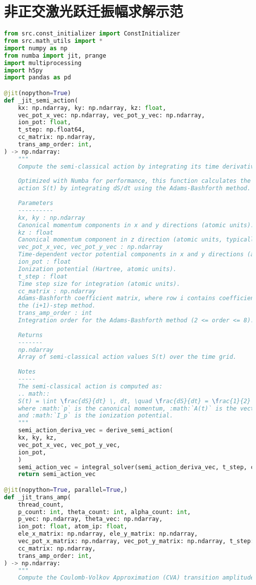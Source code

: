 \section{非正交激光跃迁振幅求解示范}\label{app:notc_cva_trans_amp}
\begin{lstlisting}[language=Python, caption={非正交激光跃迁振幅求解示范}, label={code:notc cva trans amp}]
from src.const_initializer import ConstInitializer
from src.math_utils import *
import numpy as np
from numba import jit, prange
import multiprocessing
import h5py
import pandas as pd

@jit(nopython=True)
def _jit_semi_action(
	kx: np.ndarray, ky: np.ndarray, kz: float,
	vec_pot_x_vec: np.ndarray, vec_pot_y_vec: np.ndarray,
	ion_pot: float,
	t_step: np.float64,
	cc_matrix: np.ndarray,
	trans_amp_order: int,
) -> np.ndarray:
	"""
	Compute the semi-classical action by integrating its time derivative.
	
	Optimized with Numba for performance, this function calculates the semi-classical
	action S(t) by integrating dS/dt using the Adams-Bashforth method.
	
	Parameters
	----------
	kx, ky : np.ndarray
	Canonical momentum components in x and y directions (atomic units).
	kz : float
	Canonical momentum component in z direction (atomic units, typically 0).
	vec_pot_x_vec, vec_pot_y_vec : np.ndarray
	Time-dependent vector potential components in x and y directions (atomic units).
	ion_pot : float
	Ionization potential (Hartree, atomic units).
	t_step : float
	Time step size for integration (atomic units).
	cc_matrix : np.ndarray
	Adams-Bashforth coefficient matrix, where row i contains coefficients for
	the (i+1)-step method.
	trans_amp_order : int
	Integration order for the Adams-Bashforth method (2 <= order <= 8).
	
	Returns
	-------
	np.ndarray
	Array of semi-classical action values S(t) over the time grid.
	
	Notes
	-----
	The semi-classical action is computed as:
	.. math::
	S(t) = \int \frac{dS}{dt} \, dt, \quad \frac{dS}{dt} = \frac{1}{2} (p + A(t))^2 + I_p
	where :math:`p` is the canonical momentum, :math:`A(t)` is the vector potential,
	and :math:`I_p` is the ionization potential.
	"""
	semi_action_deriva_vec = derive_semi_action(
	kx, ky, kz,
	vec_pot_x_vec, vec_pot_y_vec,
	ion_pot,
	)
	semi_action_vec = integral_solver(semi_action_deriva_vec, t_step, cc_matrix, trans_amp_order)
	return semi_action_vec

@jit(nopython=True, parallel=True,)
def _jit_trans_amp(
	thread_count,
	p_count: int, theta_count: int, alpha_count: int,
	p_vec: np.ndarray, theta_vec: np.ndarray,
	ion_pot: float, atom_ip: float,
	ele_x_matrix: np.ndarray, ele_y_matrix: np.ndarray,
	vec_pot_x_matrix: np.ndarray, vec_pot_y_matrix: np.ndarray, t_step: np.float64,
	cc_matrix: np.ndarray,
	trans_amp_order: int,
) -> np.ndarray:
	"""
	Compute the Coulomb-Volkov Approximation (CVA) transition amplitude.
	

\end{lstlisting}
